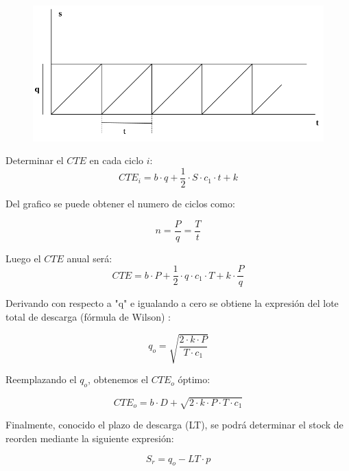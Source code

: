 \documentclass{article}
\begin{document}
\begin{figure}[h!]
    \includegraphics[width=\linewidth]{imagenes/modelo-stock-aprovicionamiento-constante.png}
\end{figure}
Determinar el \(CTE\) en cada ciclo \(i\):
\begin{equation}
    CTE_i= b \cdot q + \frac{1}{2} \cdot S \cdot c_1 \cdot t + k
\end{equation}

Del grafico se puede obtener el numero de ciclos como:

\begin{equation}
    n = \frac{P}{q} = \frac{T}{t}
\end{equation}

Luego el \(CTE\) anual será:
\begin{equation}
    CTE = b \cdot P + \frac{1}{2} \cdot q \cdot c_1 \cdot T + k \cdot \frac{P}{q}
\end{equation}

Derivando con respecto a "q" e igualando a cero se obtiene la expresión del lote total de descarga (fórmula de Wilson) :

\begin{equation}
    q_o = \sqrt{\frac{2 \cdot k \cdot P}{T \cdot c_1 }}
\end{equation}

Reemplazando el \(q_o\), obtenemos el \(CTE_o\) óptimo:

\begin{equation}
    CTE_o = b \cdot D + \sqrt{2 \cdot k \cdot P \cdot T \cdot c_1 }
\end{equation}

Finalmente, conocido el plazo de descarga (LT), se podrá determinar el stock de reorden 
mediante la siguiente expresión:

\begin{equation}
    S_r = q_o - LT \cdot p
\end{equation}
\end{document}
